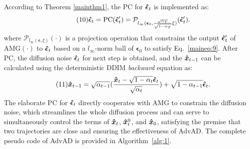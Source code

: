 \documentclass{article}
\begin{document}
According to {Theorem} \ref{mainthm1}, the PC for $\boldsymbol{\Hat{\epsilon}}_{t}$ is implemented as:
\begin{equation}\tag{10}
    \boldsymbol{\Hat{\epsilon}}_{t} = \text{PC}(\boldsymbol{\Hat{\epsilon}}'_{t}) = \mathcal{P}_{l_{\infty}({\boldsymbol{\epsilon}_{0}},{\frac{\sqrt{\alpha_T}}{\sqrt{1-\alpha_T}}\xi})}(\boldsymbol{\Hat{\epsilon}}'_{t}).
\label{maineq:10}
\end{equation}
where $\mathcal{P}_{l_{\infty}({\boldsymbol{\epsilon}},{\xi})}(\cdot)$ is a projection operation that constrains the output $\boldsymbol{\Hat{\epsilon}}'_{t}$ of AMG$(\cdot)$ to $\boldsymbol{\Hat{\epsilon}}_{t}$ based on a $l_{\infty}$-norm ball of $\boldsymbol{{\epsilon}}_{0}$ to satisfy Eq.~\eqref{maineq:9}. 
After PC, the diffusion noise $\boldsymbol{\Hat{\epsilon}}_{t}$ for next step is obtained, and the $\boldsymbol{\Hat{x}}_{t-1}$ can be calculated using the deterministic DDIM \textit{backward} equation as:
\begin{equation}\tag{11}
    \boldsymbol{\Hat{x}}_{t-1} = \sqrt{\alpha_{t-1}}(\frac{\boldsymbol{\Hat{x}}_t-\sqrt{1-\alpha_t}\boldsymbol{\Hat{\epsilon}}_t}{\sqrt{\alpha_t}}) + \sqrt{1-\alpha_{t-1}}\boldsymbol{\Hat{\epsilon}}_t.
\label{maineq:11}
\end{equation} 
The elaborate PC for $\boldsymbol{\Hat{\epsilon}}_{t}$ directly cooperates with AMG to constrain the diffusion noise, which streamlines the whole diffusion process and can serve to simultaneously control the terms of $\boldsymbol{\Hat{x}}_{t}$, $\boldsymbol{\Hat{x}}_{t}^{0}$, and $\boldsymbol{\Hat{x}}_{0}$, satisfying the premise that two trajectories are close and ensuring the effectiveness of AdvAD. The complete pseudo code of AdvAD is provided in Algorithm~\ref{alg:1}.
\end{document}
